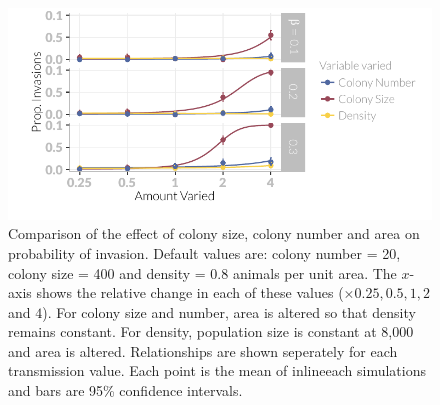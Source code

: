 \begin{knitrout}\footnotesize
{}\color{fgcolor}\begin{figure}[t]

{\centering \includegraphics[width=\textwidth]{figure/plotValueChangeMeans-1} 

}

\caption[Comparison of the probability of invasion when population size is altered by changing colony size or colony number.]{
Comparison of the effect of colony size, colony number and area on probability of invasion.
Default values are: colony number = 20, colony size = 400 and density = 0.8 animals per unit area.
The $x$-axis shows the relative change in each of these values ($\times 0.25, 0.5, 1, 2$ and $4$).
For colony size and number, area is altered  so that density remains constant.
For density, population size is constant at 8,000 and area is altered.
Relationships are shown seperately for each transmission value.
Each point is the mean of 
inline{each} simulations and bars are 95\% confidence intervals.
}\label{fig:plotValueChangeMeans}
\end{figure}


\end{knitrout}






